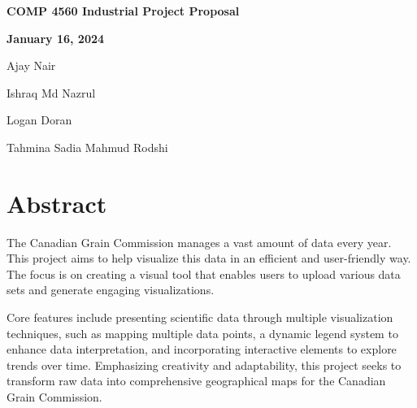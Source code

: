 \documentclass[12pt]{article}
\begin{document}
\begin{titlepage}
    \centering
    \vspace*{\fill}
    {\LARGE\bfseries  COMP 4560 Industrial Project Proposal}
    \vfill 

    \begin{flushleft}
        {\Large\bfseries January 16, 2024}
        \vspace{0.2cm} 

        {\large
        Ajay Nair\par
        Ishraq Md Nazrul\par
        Logan Doran\par
        Tahmina Sadia Mahmud Rodshi\par
        }
    \end{flushleft}
\end{titlepage}

\tableofcontents
\newpage

\section*{Abstract}
The Canadian Grain Commission manages a vast amount of data every year. This project aims to help visualize this data in an efficient and user-friendly way. The focus is on creating a visual tool that enables users to upload various data sets and generate engaging visualizations. 

Core features include presenting scientific data through multiple visualization techniques, such as mapping multiple data points, a dynamic legend system to enhance data interpretation, and incorporating interactive elements to explore trends over time. Emphasizing creativity and adaptability, this project seeks to transform raw data into comprehensive geographical maps for the Canadian Grain Commission. 

\end{document}
